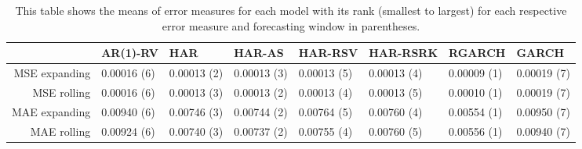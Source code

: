 \begin{table}[ht]
\centering
\begin{tabular}{rlllllll}
  \hline
 & AR(1)-RV & HAR & HAR-AS & HAR-RSV & HAR-RSRK & RGARCH & GARCH \\ 
  \hline
MSE expanding & 0.00016 (6) & 0.00013 (2) & 0.00013 (3) & 0.00013 (5) & 0.00013 (4) & 0.00009 (1) & 0.00019 (7) \\ 
  MSE rolling & 0.00016 (6) & 0.00013 (3) & 0.00013 (2) & 0.00013 (4) & 0.00013 (5) & 0.00010 (1) & 0.00019 (7) \\ 
  MAE expanding & 0.00940 (6) & 0.00746 (3) & 0.00744 (2) & 0.00764 (5) & 0.00760 (4) & 0.00554 (1) & 0.00950 (7) \\ 
  MAE rolling & 0.00924 (6) & 0.00740 (3) & 0.00737 (2) & 0.00755 (4) & 0.00760 (5) & 0.00556 (1) & 0.00940 (7) \\ 
   \hline
\end{tabular}
\caption[Error measures means]{This table shows the means of error measures for each model with its rank (smallest to largest) for each respective error measure and forecasting window in parentheses. } 
\label{Table:Error_means}
\end{table}
